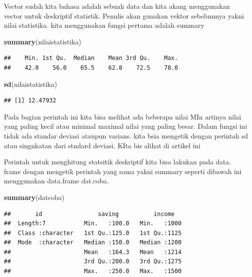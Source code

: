 \documentclass[
]{book}
\newenvironment{Shaded}{\begin{snugshade}}{\end{snugshade}}
\newcommand{\FunctionTok}[1]{\textcolor[rgb]{0.13,0.29,0.53}{\textbf{#1}}}
\newcommand{\NormalTok}[1]{#1}
\theoremstyle{definition}
\theoremstyle{definition}
\theoremstyle{definition}
\theoremstyle{definition}
\theoremstyle{remark}
\begin{document}
Vector sudah kita bahasa adalah sebuah data dan kita akang menggunakan vector untuk deskriptif statistik. Penulis akan gunakan vektor sebelumnya yakni nilai statistika. kita menggunakan fungsi pertama adalah summary

\begin{Shaded}
\begin{Highlighting}[]
\FunctionTok{summary}\NormalTok{(nilaistatistika)}
\end{Highlighting}
\end{Shaded}

\begin{verbatim}
##    Min. 1st Qu.  Median    Mean 3rd Qu.    Max. 
##    42.0    56.0    65.5    62.8    72.5    78.0
\end{verbatim}

\begin{Shaded}
\begin{Highlighting}[]
\FunctionTok{sd}\NormalTok{(nilaistatistika)}
\end{Highlighting}
\end{Shaded}

\begin{verbatim}
## [1] 12.47932
\end{verbatim}

Pada bagian perintah ini kita bisa melihat ada beberapa nilai MIn artinya nilai yang paling kecil atau minimal maximal nilai yang paling besar. Dalam fungsi ini tidak ada standar deviasi ataupun varians. kita bsia mengetik dengan perintah sd atau singnkatan dari stndard deviasi. KIta bis alihat di artikel ini \citet{Platter2024}

Perintah untuk menghitung statsitik deskriptif kita bisa lakukan pada data. frame dengan mengetik perintah yang sama yakni summary seperti dibawah ini menggunakan data.frame dat.coba.

\begin{Shaded}
\begin{Highlighting}[]
\FunctionTok{summary}\NormalTok{(datcoba)}
\end{Highlighting}
\end{Shaded}

\begin{verbatim}
##       id                saving          income    
##  Length:7           Min.   :100.0   Min.   :1000  
##  Class :character   1st Qu.:125.0   1st Qu.:1125  
##  Mode  :character   Median :150.0   Median :1200  
##                     Mean   :164.3   Mean   :1214  
##                     3rd Qu.:200.0   3rd Qu.:1275  
##                     Max.   :250.0   Max.   :1500
\end{verbatim}
\end{document}

